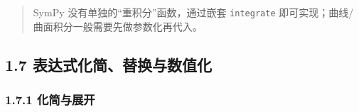 \begin{Shaded}
\begin{Highlighting}[]
\OperatorTok{=}\NormalTok{)}
\OperatorTok{=}\OperatorTok{+}
\NormalTok{, }\NormalTok{, }\NormalTok{)))}
\end{Highlighting}
\end{Shaded}

\begin{Shaded}
\begin{Highlighting}[]
\end{Highlighting}
\end{Shaded}

\begin{quote}
SymPy 没有单独的``重积分''函数，通过嵌套 \texttt{integrate}
即可实现；曲线/曲面积分一般需要先做参数化再代入。
\end{quote}

\subsection{1.7
表达式化简、替换与数值化}\label{ux8868ux8fbeux5f0fux5316ux7b80ux66ffux6362ux4e0eux6570ux503cux5316}

\subsubsection{1.7.1 化简与展开}\label{ux5316ux7b80ux4e0eux5c55ux5f00}

\begin{Shaded}
\begin{Highlighting}[]
\OperatorTok{=}\NormalTok{)}
\OperatorTok{=}\OperatorTok{**} \OperatorTok{+} \OperatorTok{*}\OperatorTok{+} 
\OperatorTok{+}\NormalTok{)}\OperatorTok{**}\NormalTok{))        }
\OperatorTok{**} \OperatorTok{+}\OperatorTok{**}\NormalTok{))   }
\OperatorTok{**} \OperatorTok{+}\OperatorTok{**}\NormalTok{))}
\end{Highlighting}
\end{Shaded}

